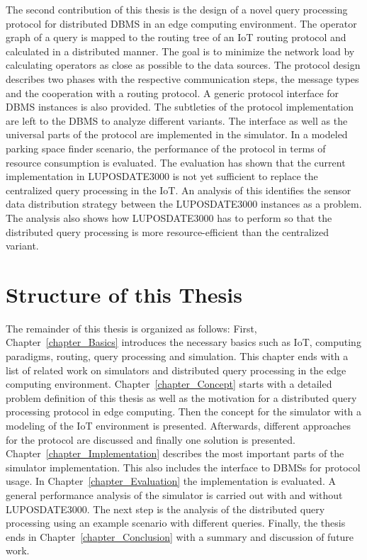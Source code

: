 \documentclass[english,version-2019-11]{uzl-thesis}
\begin{document}
The second contribution of this thesis is the design of a novel query processing protocol for distributed DBMS in an edge computing environment. The operator graph of a query is mapped to the routing tree of an IoT routing protocol and calculated in a distributed manner. The goal is to minimize the network load by calculating operators as close as possible to the data sources. The protocol design describes two phases with the respective communication steps, the message types and the cooperation with a routing protocol. A generic protocol interface for DBMS instances is also provided. The subtleties of the protocol implementation are left to the DBMS to analyze different variants. The interface as well as the universal parts of the protocol are implemented in the simulator. In a modeled parking space finder scenario, the performance of the protocol in terms of resource consumption is evaluated. The evaluation has shown that the current implementation in LUPOSDATE3000 is not yet sufficient to replace the centralized query processing in the IoT. An analysis of this identifies the sensor data distribution strategy between the LUPOSDATE3000 instances as a problem. The analysis also shows how LUPOSDATE3000 has to perform so that the distributed query processing is more resource-efficient than the centralized variant.


\section{Structure of this Thesis}
The remainder of this thesis is organized as follows: First, Chapter~\ref{chapter_Basics} introduces the necessary basics such as IoT, computing paradigms, routing, query processing and simulation. This chapter ends with a list of related work on simulators and distributed query processing in the edge computing environment. Chapter~\ref{chapter_Concept} starts with a detailed problem definition of this thesis as well as the motivation for a distributed query processing protocol in edge computing. Then the concept for the simulator with a modeling of the IoT environment is presented. Afterwards, different approaches for the protocol are discussed and finally one solution is presented.
Chapter~\ref{chapter_Implementation} describes the most important parts of the simulator implementation. This also includes the interface
to DBMSs for protocol usage. In Chapter~\ref{chapter_Evaluation} the implementation is evaluated. A general performance analysis of the simulator is carried out with and without LUPOSDATE3000. The next step is the analysis of the distributed query processing using an example scenario with different queries. Finally, the thesis ends in Chapter~\ref{chapter_Conclusion} with a summary and discussion of future work.
\end{document}
